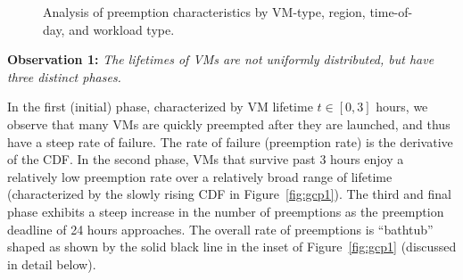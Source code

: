 \begin{figure}
  \hfill
{}
\hfill
{}
\vspace*{-0.6cm}
\caption{Analysis of preemption characteristics by VM-type, region, time-of-day, and workload type.}
\label{fig:breakdown-all}
    \vspace*{\myfigspace}
\end{figure}

\noindent \textbf{Observation 1:} \emph{The lifetimes of VMs are not uniformly distributed, but have three distinct phases.}

\noindent In the first (initial) phase, characterized by VM lifetime $t\in [0, 3]$ hours, we observe that many VMs are quickly preempted after they are launched, and thus have a steep rate of failure. The rate of failure (preemption rate) is the derivative of the CDF.
In the second phase, VMs that survive past 3 hours enjoy a relatively low preemption rate over a relatively broad range of lifetime (characterized by the slowly rising CDF in Figure~\ref{fig:gcp1}).
The third and final phase exhibits a steep increase in the number of preemptions as the preemption deadline of 24 hours approaches.
The overall rate of preemptions is ``bathtub'' shaped as shown by the solid black line in the inset of Figure~\ref{fig:gcp1} (discussed in detail below).

